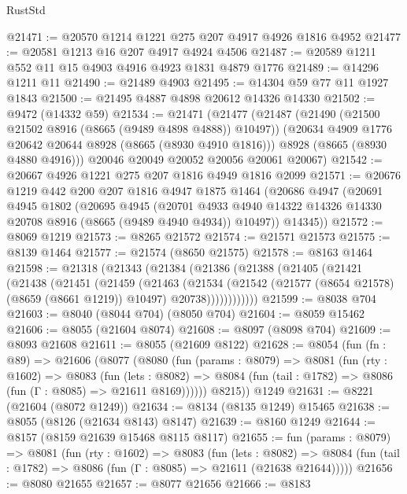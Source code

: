 \begin{lexlean}{RustStd}
\begin{coremodule}
@21471 := @20570 @1214 @1221 @275 @207 @4917 @4926 @1816 @4952
@21477 := @20581 @1213 @16 @207 @4917 @4924 @4506
@21487 := @20589 @1211 @552 @11 @15 @4903 @4916 @4923 @1831 @4879 @1776
@21489 := @14296 @1211 @11
@21490 := @21489 @4903
@21495 := @14304 @59 @77 @11 @1927 @1843
@21500 := @21495 @4887 @4898 @20612 @14326 @14330
@21502 := @9472 (@14332 @59)
@21534 := @21471
    (@21477
      (@21487
        (@21490 (@21500 @21502 @8916 (@8665 (@9489 @4898 @4888)) @10497))
        (@20634 @4909 @1776 @20642 @20644 @8928 (@8665 (@8930 @4910 @1816)))
        @8928
        (@8665 (@8930 @4880 @4916)))
      @20046
      @20049
      @20052
      @20056
      @20061
      @20067)
@21542 := @20667 @4926 @1221 @275 @207 @1816 @4949 @1816 @2099
@21571 := @20676
    @1219
    @442
    @200
    @207
    @1816
    @4947
    @1875
    @1464
    (@20686
      @4947
      (@20691
        @4945
        @1802
        (@20695
          @4945
          (@20701 @4933 @4940 @14322 @14326 @14330 @20708 @8916 (@8665 (@9489 @4940 @4934)) @10497))
        @14345))
@21572 := @8069 @1219
@21573 := @8265 @21572
@21574 := @21571 @21573
@21575 := @8139 @1464
@21577 := @21574 (@8650 @21575)
@21578 := @8163 @1464
@21598 := @21318
    (@21343
      (@21384
        (@21386
          (@21388
            (@21405
              (@21421
                (@21438
                  (@21451
                    (@21459
                      (@21463
                        (@21534
                          (@21542
                            (@21577 (@8654 @21578) (@8659 (@8661 @1219)) @10497)
                            @20738))))))))))))
@21599 := @8038 @704
@21603 := @8040 (@8044 @704) (@8050 @704)
@21604 := @8059 @15462
@21606 := @8055 (@21604 @8074)
@21608 := @8097 (@8098 @704)
@21609 := @8093 @21608
@21611 := @8055 (@21609 @8122)
@21628 := @8054
    (fun (fn : @89) =>
    @21606
      (@8077
        (@8080
          (fun (params : @8079) =>
          @8081
            (fun (rty : @1602) =>
            @8083
              (fun (lets : @8082) =>
              @8084 (fun (tail : @1782) => @8086 (fun (Γ : @8085) => @21611 @8169))))))
        @8215))
    @1249
@21631 := @8221 (@21604 (@8072 @1249))
@21634 := @8134 (@8135 @1249) @15465
@21638 := @8055 (@8126 (@21634 @8143) @8147)
@21639 := @8160 @1249
@21644 := @8157 (@8159 @21639 @15468 @8115 @8117)
@21655 := fun (params : @8079) =>
  @8081
    (fun (rty : @1602) =>
    @8083
      (fun (lets : @8082) =>
      @8084 (fun (tail : @1782) => @8086 (fun (Γ : @8085) => @21611 (@21638 @21644)))))
@21656 := @8080 @21655
@21657 := @8077 @21656
@21666 := @8183

\end{coremodule}
\end{lexlean}
